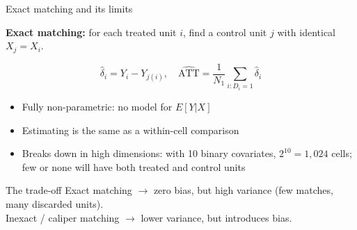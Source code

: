 \documentclass[aspectratio=169, 10pt]{beamer}
\begin{document}

\begin{frame}{Exact matching and its limits}

  \textbf{Exact matching:} for each treated unit $i$, find a control unit $j$ with identical $X_j = X_i$.

  \[
    \widehat{\delta}_i = Y_i - Y_{j(i)}, \quad
    \widehat{\text{ATT}} = \frac{1}{N_1} \sum_{i: D_i=1} \widehat{\delta}_i
  \]

  \bigskip
  \begin{itemize}
    \item Fully non-parametric: no model for $E[Y|X]$
    \item Estimating is the same as a within-cell comparison
    \item \alert{Breaks down in high dimensions:} with 10 binary covariates, $2^{10} = 1{,}024$ cells; few or none will have both treated and control units
  \end{itemize}

  \bigskip
  \begin{block}{The trade-off}
    Exact matching $\rightarrow$ zero bias, but high variance (few matches, many discarded units).\\
    Inexact / caliper matching $\rightarrow$ lower variance, but introduces bias.
  \end{block}
\end{frame}

\end{document}
